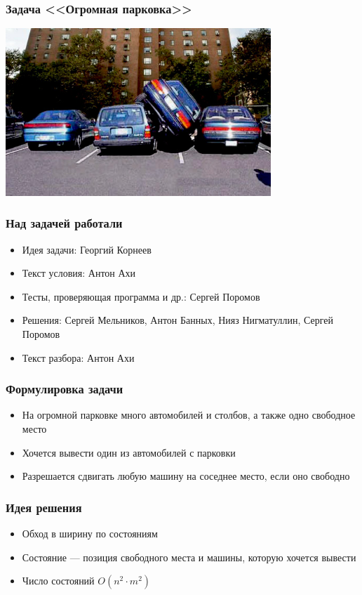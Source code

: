 
\begin{frame}
  \frametitle{Задача <<Огромная парковка>>}
  \begin{center}
    \includegraphics[width=10cm]{parking.eps}
  \end{center}
\end{frame}

\begin{frame}
  \frametitle{Над задачей работали}
  \begin{itemize}
    \item Идея задачи: Георгий Корнеев
    \item Текст условия: Антон Ахи
    \item Тесты, проверяющая программа и др.: Сергей Поромов
    \item Решения: Сергей Мельников, Антон Банных, Нияз Нигматуллин, Сергей Поромов
    \item Текст разбора: Антон Ахи
  \end{itemize}
\end{frame}

\begin{frame}
  \frametitle{Формулировка задачи}
  \begin{itemize}
    \item На огромной парковке много автомобилей и столбов, а также одно свободное место
    \item Хочется вывести один из автомобилей с парковки
    \item Разрешается сдвигать любую машину на соседнее место, если оно свободно
  \end{itemize}
\end{frame}

\begin{frame}
  \frametitle{Идея решения}
  \begin{itemize}
    \item Обход в ширину по состояниям
    \item Состояние --- позиция свободного места и машины, которую хочется вывести
    \item Число состояний $O(n^2 \cdot m^2)$
  \end{itemize}
\end{frame}

